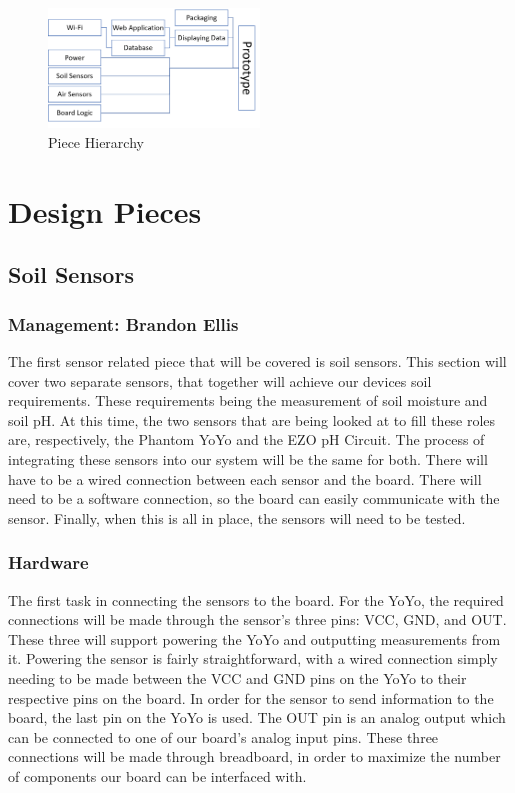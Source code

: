 \documentclass[IEEEtran,letterpaper,10pt,titlepage,fleqn,draftclsnofoot,onecolumn]{article}
\begin{document}
\begin{figure}[H]
  \caption{Piece Hierarchy}
  \centering
  \includegraphics[width=0.5\textwidth]{hierarchy}
\end{figure}

\section{Design Pieces}
\subsection{Soil Sensors}
\subsubsection{Management: Brandon Ellis}

The first sensor related piece that will be covered is soil sensors. This section will cover two separate sensors, that together will achieve our devices soil requirements. These requirements being the measurement of soil moisture and soil pH. At this time, the two sensors that are being looked at to fill these roles are, respectively, the Phantom YoYo and the EZO pH Circuit. The process of integrating these sensors into our system will be the same for both. There will have to be a wired connection between each sensor and the board. There will need to be a software connection, so the board can easily communicate with the sensor. Finally, when this is all in place, the sensors will need to be tested.

\subsubsection{Hardware}

The first task in connecting the sensors to the board. For the YoYo, the required connections will be made through the sensor’s three pins: VCC, GND, and OUT. These three will support powering the YoYo and outputting measurements from it. Powering the sensor is fairly straightforward, with a wired connection simply needing to be made between the VCC and GND pins on the YoYo to their respective pins on the board. In order for the sensor to send information to the board, the last pin on the YoYo is used. The OUT pin is an analog output which can be connected to one of our board’s analog input pins. These three connections will be made through breadboard, in order to maximize the number of components our board can be interfaced with. 
\end{document}
